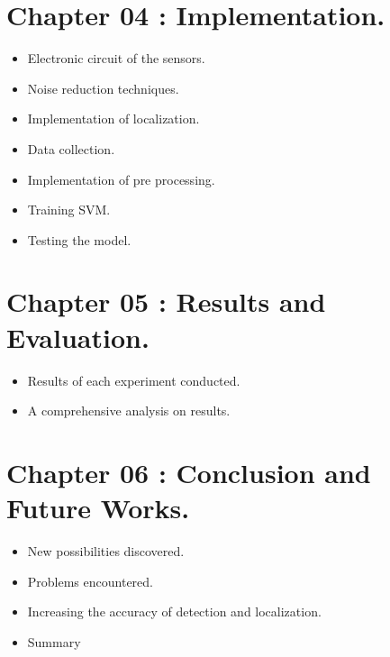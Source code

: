 \documentclass[11pt]{article}
\numberwithin{figure}{section}
\numberwithin{table}{section}
\begin{document}
\section*{Chapter 04 : Implementation.}
\begin{itemize}
  \item Electronic circuit of the sensors.
  \item Noise reduction techniques.
  \item Implementation of localization.
  \item Data collection.
  \item Implementation of pre processing.
  \item Training SVM.
  \item Testing the model.
\end{itemize}
\section*{Chapter 05 : Results and Evaluation.}
\begin{itemize}
  \item Results of each experiment conducted.
  \item A comprehensive analysis on results.
\end{itemize}
\section*{Chapter 06 : Conclusion and Future Works.}
\begin{itemize}
  \item New possibilities discovered.
  \item Problems encountered.
  \item Increasing the accuracy of detection and localization.
  \item Summary
\end{itemize}
\newpage

\end{document}
